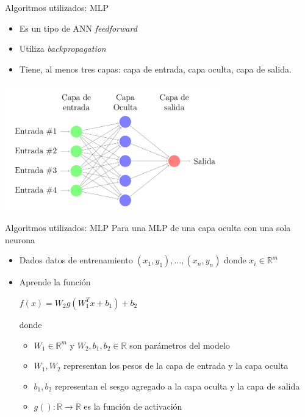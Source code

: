 \documentclass[10pt]{beamer}
\begin{document}
\begin{frame}{Algoritmos utilizados: MLP}
  \begin{itemize}
    \item Es un tipo de ANN \textit{feedforward}
    \item Utiliza \textit{backpropagation}
    \item Tiene, al menos tres capas: capa de entrada, capa oculta, capa de salida.
  \end{itemize}
  \begin{center}
    \includegraphics[width=0.7\textwidth]{ejemplo_mlp}%
  \end{center}
\end{frame}




\begin{frame}{Algoritmos utilizados: MLP}
  Para una MLP de una capa oculta con una sola neurona
  \begin{itemize}
    \item Dados datos de entrenamiento $(x_{1}, y_{1}), \dots, (x_{n}, y_{n})$
    donde $x_{i} \in \mathbb{R}^{m}$
    \item Aprende la función
      \begin{center}
        $f(x) = W_{2}g(W_{1}^{T} x + b_{1}) + b_{2}$
      \end{center}
      donde
        \begin{itemize}
          \item $W_{1} \in \mathbb{R}^{m}$ y $W_{2}, b_{1}, b_{2} \in \mathbb{R}$ son parámetros del modelo
          \item $W_{1}, W_{2}$ representan los pesos de la capa de entrada y la capa oculta
          \item $b_{1}, b_{2}$ representan el sesgo agregado a la capa oculta y la capa de salida
          \item $g(): \mathbb{R} \rightarrow \mathbb{R}$ es la función de activación
        \end{itemize}

  \end{itemize}
\end{frame}
\end{document}
